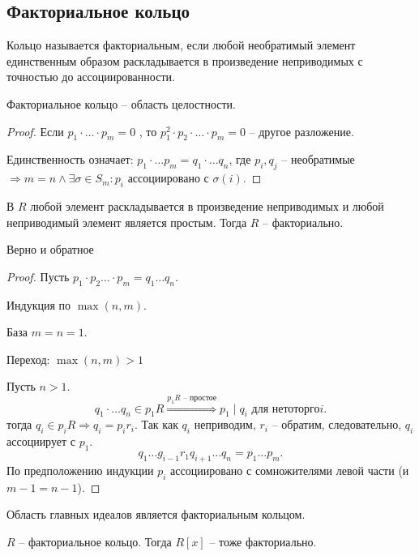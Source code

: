 \documentclass[12pt]{report}
\begin{document}
\subsection{Факториальное кольцо}
\begin{defn}
    Кольцо называется факториальным, если любой необратимый элемент единственным образом раскладывается в произведение неприводимых с точностью до ассоциированности.
\end{defn}
\begin{lm}
    Факториальное кольцо -- область целостности.
\end{lm}
\begin{proof}
    Если $ p_1\cdot \ldots \cdot p_m = 0$ , то $ p_1^2 \cdot p_2 \cdot \ldots  \cdot p_m = 0$ -- другое разложение.

    Единственность означает:
    $ p_1 \cdot \ldots  p_m = q_1 \cdot \ldots q_n $, где $ p_i, q_j$ -- необратимые $ \Longrightarrow m=n \wedge \exists  \sigma \in  S_m: p_i  $ ассоциировано с $ \sigma (i)$.
\end{proof}
\begin{thm}
    В $ R$ любой элемент раскладывается в произведение неприводимых и любой неприводимый элемент является простым. Тогда $ R$ -- факториально.
\end{thm}
\begin{note}
    Верно и обратное
\end{note}
\begin{proof}
    Пусть $ p_1 \cdot p_2 \ldots  \cdot p_m = q_1 \ldots  q_n$.

    Индукция по $ \max(n, m)$.

    База $m=n = 1$.

    Переход:  $ \max(n, m) > 1$

    Пусть $ n > 1$. \[
	q_1 \cdot \ldots q_n \in  p_1 R \stackrel{p_1 R \text{ -- простое}}\Longrightarrow  p_1\mid q_i \text{  для нетоторго} i  
    .\] 
    тогда $q_i \in  p_i R \Longrightarrow  q_i = p_i r_i$. Так как $ q_i$  неприводим, $ r_i$ -- обратим, следовательно, $ q_i$ ассоциирует с $ p_1$.
\[
q_1 \ldots g_{i-1} r_1 q_{i+1} \ldots  q_n = p_1 \ldots  p_m
.\] 
По предположению индукции $ p_i$ ассоциировано с сомножителями левой части (и $ m-1 = n-1$).
\end{proof}
\begin{cor}
    Область главных идеалов является факториальным кольцом.
\end{cor}
\begin{thm}
    $ R$ -- факториальное кольцо. Тогда $ R[x]$ -- тоже факториально.
\end{thm}
\end{document}
